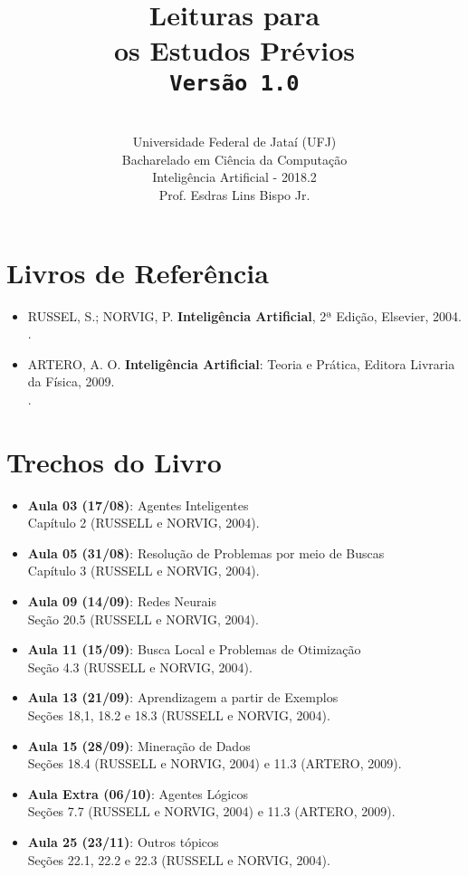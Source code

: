 \documentclass[12pt,a4paper,oneside]{article}
\author{\\Universidade Federal de Jataí (UFJ)\\Bacharelado em Ciência da Computação \\Inteligência Artificial - 2018.2 \\Prof. Esdras Lins Bispo Jr.}
\date{}
\title{
	\sc \huge Leituras para \\os Estudos Prévios
	\\{\tt Versão 1.0}
}
\begin{document}
\maketitle

\section{Livros de Referência}
	\begin{itemize}
		\item RUSSEL, S.; NORVIG, P. {\bf Inteligência Artificial}, 2ª Edição, Elsevier, 2004. \\ {\color{blue}{\bf Código Bib.: [004.89 RUS /int]}}.
		\item ARTERO, A. O. {\bf Inteligência Artificial}: Teoria e Prática, Editora Livraria da Física, 2009. \\ {\color{blue}{\bf Código Bib.: [004.89 ART /int]}}.
	\end{itemize}
	
\section{Trechos do Livro}

\begin{itemize}
	
	\item[] {\bf Aula 03 (17/08)}: Agentes Inteligentes
	\\Capítulo 2 (RUSSELL e NORVIG, 2004).
	
	\item[] {\bf Aula 05 (31/08)}: Resolução de Problemas por meio de Buscas
	\\ Capítulo 3 (RUSSELL e NORVIG, 2004).
	
	\item[] {\bf Aula 09 (14/09)}: Redes Neurais
	\\Seção 20.5 (RUSSELL e NORVIG, 2004).
	
	\item[] {\bf Aula 11 (15/09)}: Busca Local e Problemas de Otimização
	\\Seção 4.3 (RUSSELL e NORVIG, 2004).
	
	\item[] {\bf Aula 13 (21/09)}: Aprendizagem a partir de Exemplos
	\\Seções 18,1, 18.2 e 18.3 (RUSSELL e NORVIG, 2004).
	
	\item[] {\bf Aula 15 (28/09)}: Mineração de Dados
	\\ Seções 18.4 (RUSSELL e NORVIG, 2004) e 11.3 (ARTERO, 2009).
	
	\item[] {\bf Aula Extra (06/10)}: Agentes Lógicos
	\\ Seções 7.7 (RUSSELL e NORVIG, 2004) e 11.3 (ARTERO, 2009).
	
	\item[] {\bf Aula 25 (23/11)}: Outros tópicos
	\\Seções 22.1, 22.2 e 22.3 (RUSSELL e NORVIG, 2004).
	
\end{itemize}
\end{document}
